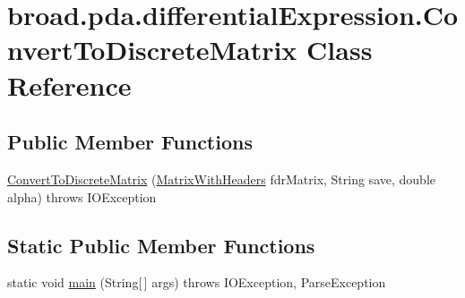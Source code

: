 \hypertarget{classbroad_1_1pda_1_1differential_expression_1_1_convert_to_discrete_matrix}{\section{broad.\+pda.\+differential\+Expression.\+Convert\+To\+Discrete\+Matrix Class Reference}
\label{classbroad_1_1pda_1_1differential_expression_1_1_convert_to_discrete_matrix}
}
\subsection*{Public Member Functions}
\begin{DoxyCompactItemize}
\item 
\hyperlink{classbroad_1_1pda_1_1differential_expression_1_1_convert_to_discrete_matrix_af4269b7d284553e5c252bd261125d7b7}{Convert\+To\+Discrete\+Matrix} (\hyperlink{classbroad_1_1core_1_1datastructures_1_1_matrix_with_headers}{Matrix\+With\+Headers} fdr\+Matrix, String save, double alpha)  throws I\+O\+Exception
\end{DoxyCompactItemize}
\subsection*{Static Public Member Functions}
\begin{DoxyCompactItemize}
\item 
static void \hyperlink{classbroad_1_1pda_1_1differential_expression_1_1_convert_to_discrete_matrix_a1f9a35c5825119896f3ff4918983ea93}{main} (String\mbox{[}$\,$\mbox{]} args)  throws I\+O\+Exception, Parse\+Exception
\end{DoxyCompactItemize}


